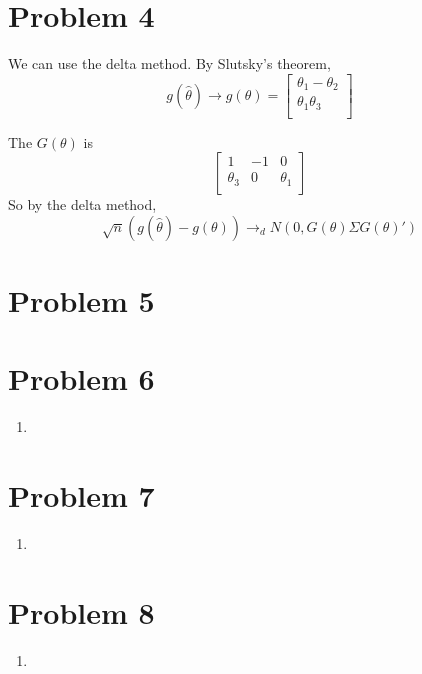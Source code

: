 \documentclass[10pt,letter]{article}
\begin{document}
\section*{Problem 4}
We can use the delta method. By Slutsky's theorem,
\[ g(\hat{\theta}) \to g(\theta) = \begin{bmatrix}
 \theta_1 - \theta_2  \\
 \theta_1\theta_3  \\
\end{bmatrix} \]

The $G(\theta)$ is
\[ \begin{bmatrix}
 1 & -1 & 0  \\
 \theta_{3} & 0 & \theta_{1} \\
\end{bmatrix} \]
So by the delta method,
\[ \sqrt{n}(g(\hat{\theta}) - g(\theta)) \to_d N(0, G(\theta)\Sigma G(\theta)') \]
\section*{Problem 5}

\section*{Problem 6}
\begin{enumerate}[label=(\alph*)]
\item
\end{enumerate}
\section*{Problem 7}
\begin{enumerate}[label=(\alph*)]
\item
\end{enumerate}
\section*{Problem 8}
\begin{enumerate}[label=(\alph*)]
\item
\end{enumerate}
\end{document}
